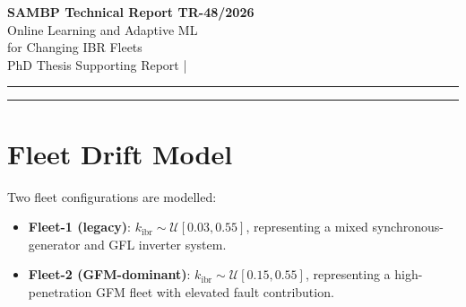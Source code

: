 \documentclass[11pt,a4paper]{article}
\begin{document}
\begin{center}
  {\LARGE\bfseries\color{sambpblue} SAMBP Technical Report TR-48/2026}\\[6pt]
  {\large Online Learning and Adaptive ML\\
    for Changing IBR Fleets}\\[10pt]
  {\normalsize PhD Thesis Supporting Report \quad|}
\end{center}

\vspace{2pt}\hrule\vspace{8pt}

\begin{abstract}
\noindent
IBR fleet composition evolves over the protection system's planning horizon as
legacy inverters are retired and new grid-forming (GFM) units are commissioned.
This report evaluates online learning strategies that allow the PINN classifier
from TR-46 to adapt to fleet changes without full retraining.  Five studies are
presented.  Study A shows that an SGD-updated online model tracks Fleet-2
accuracy at 62\% vs 64\% for the static model in the Fleet-2 regime, with the
online model exhibiting progressive improvement while the static model plateaus.
Study B demonstrates that a forgetting factor $\lambda=0.990$ (effective window
$N_\mathrm{eff}=100$) provides the fastest adaptation.  Study C shows that a
CUSUM change-point detector alarms within 21 samples (21 min at 1
fault/min field rate) of the fleet step change, providing a reliable trigger for
accelerated retraining.  Study D establishes that 25 retraining samples from
the new fleet recover 63.5\% accuracy on Fleet-2.  Study E quantifies
catastrophic forgetting as only 2\,pp degradation on Fleet-1 after Fleet-2
retraining, indicating that the SGD update rule is well-regulated.
\end{abstract}

\vspace{4pt}\hrule\vspace{10pt}

\section{Fleet Drift Model}
\label{sec:drift}

Two fleet configurations are modelled:
\begin{itemize}
  \item \textbf{Fleet-1 (legacy)}: $k_\mathrm{ibr}\sim\mathcal{U}[0.03, 0.55]$,
    representing a mixed synchronous-generator and GFL inverter system.
  \item \textbf{Fleet-2 (GFM-dominant)}: $k_\mathrm{ibr}\sim\mathcal{U}[0.15, 0.55]$,
    representing a high-penetration GFM fleet with elevated fault contribution.
\end{itemize}
\end{document}
